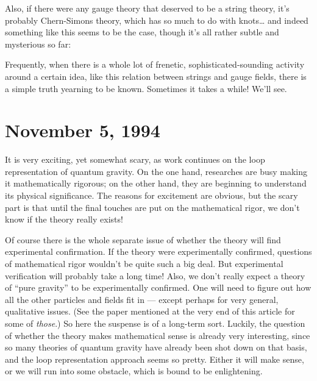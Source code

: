 \documentclass{article}
\def\tightlist{}
\renewcommand{\texttt}[1]{%
  \begingroup
  \ttfamily
  \begingroup\lccode`~=`/\lowercase{\endgroup\def~}{/\discretionary{}{}{}}%
  \begingroup\lccode`~=`[\lowercase{\endgroup\def~}{[\discretionary{}{}{}}%
  \begingroup\lccode`~=`.\lowercase{\endgroup\def~}{.\discretionary{}{}{}}%
  \catcode`/=\active\catcode`[=\active\catcode`.=\active
  \scantokens{#1\noexpand}%
  \endgroup
}
\begin{document}
Also, if there were any gauge theory that deserved to be a string
theory, it's probably Chern-Simons theory, which has so much to do with
knots\ldots{} and indeed something like this seems to be the case,
though it's all rather subtle and mysterious so far:


Frequently, when there is a whole lot of frenetic,
sophisticated-sounding activity around a certain idea, like this
relation between strings and gauge fields, there is a simple truth
yearning to be known. Sometimes it takes a while! We'll see.
\hypertarget{week43}{%
\section{November 5, 1994}\label{week43}}

It is very exciting, yet somewhat scary, as work continues on the loop
representation of quantum gravity. On the one hand, researches are busy
making it mathematically rigorous; on the other hand, they are beginning
to understand its physical significance. The reasons for excitement are
obvious, but the scary part is that until the final touches are put on
the mathematical rigor, we don't know if the theory really exists!

Of course there is the whole separate issue of whether the theory will
find experimental confirmation. If the theory were experimentally
confirmed, questions of mathematical rigor wouldn't be quite such a big
deal. But experimental verification will probably take a long time!
Also, we don't really expect a theory of ``pure gravity'' to be
experimentally confirmed. One will need to figure out how all the other
particles and fields fit in --- except perhaps for very general,
qualitative issues. (See the paper mentioned at the very end of this
article for some of \emph{those}.) So here the suspense is of a
long-term sort. Luckily, the question of whether the theory makes
mathematical sense is already very interesting, since so many theories
of quantum gravity have already been shot down on that basis, and the
loop representation approach seems so pretty. Either it will make sense,
or we will run into some obstacle, which is bound to be enlightening.
\end{document}
